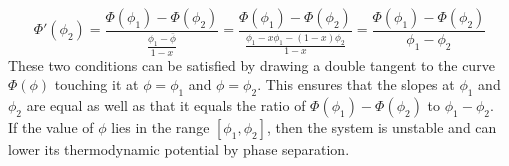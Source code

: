             \begin{equation}
                \Phi'(\phi_2)=\frac{\Phi(\phi_1)-\Phi(\phi_2)}{\frac{\phi_1-\bar{\phi}}{1-x}}=\frac{\Phi(\phi_1)-\Phi(\phi_2)}{\frac{\phi_1-x\phi_1-(1-x)\phi_2}{1-x}}=\frac{\Phi(\phi_1)-\Phi(\phi_2)}{\phi_1-\phi_2}
            \end{equation}
            These two conditions can be satisfied by drawing a double tangent to the curve $\Phi(\phi)$ touching it at $\phi=\phi_1$ and $\phi=\phi_2$. This ensures that the slopes at $\phi_1$ and $\phi_2$ are equal as well as that it equals the ratio of $\Phi(\phi_1)-\Phi(\phi_2)$ to $\phi_1-\phi_2$. \\
            If the value of $\phi$ lies in the range $[\phi_1,\phi_2]$, then the system is unstable and can lower its thermodynamic potential by phase separation. 